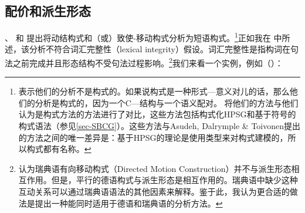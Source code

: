 \subsection{配价和派生形态}
\label{sec-val-morph}\label{sec-phrasal-LI}\label{sec-inheritance-passive-LFG}
 \citet{GJ2004a}、 \citet{Alsina96a}和 \citet*{ADT2008a,ADT2013a}提出将动结构式和（或）致使-移动构式分析为短语构式。\footnote{%
 \citet[\S~2.3]{AT2014a}表示他们的分析不是构式的。如果说构式是一种形式—意义对儿的话，那么他们的分析是构式的，因为一个C—结构与一个语义配对。 \citet[\S~2.2]{AT2014a}将他们的方法与他们认为是构式方法的方法进行了对比，这些方法包括构式化HPSG\citep{Sag97a}和基于符号的构式语法（参见\ref{sec-SBCG}）。这些方法与Asudeh, Dalrymple \& Toivonen提出的方法之间的唯一差异是：基于HPSG的理论是使用类型来对构式建模的，所以构式都有名称。%
}正如我在 中所述，该分析不符合词汇完整性（lexical integrity）假设。词汇完整性是指构词在句法之前完成并且形态结构不受句法过程影响\citep{BM95a}。\footnote{%
   \citet[]{ADT2013a} 认为瑞典语有向移动构式（Directed Motion Construction）并不与派生形态相互作用。但是，平行的德语构式与派生形态是相互作用的。瑞典语中缺少这种互动关系可以通过瑞典语语法的其他因素来解释。鉴于此，我认为更合适的做法是提出一种能同时适用于德语和瑞典语的分析方法。%
}我们来看一个实例，例如（）：
